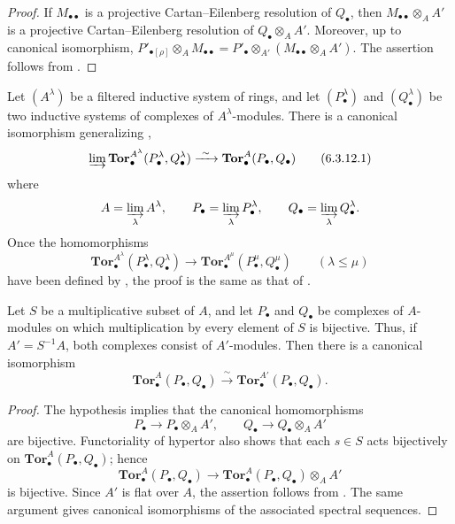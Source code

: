 \begin{proof}
If $M_{\bullet\bullet}$ is a projective Cartan--Eilenberg
resolution of $Q_\bullet$, then
$M_{\bullet\bullet}\otimes_AA'$ is a projective
Cartan--Eilenberg resolution of $Q_\bullet\otimes_AA'$.  Moreover,
up to canonical isomorphism, $P'_{\bullet[\rho]}\otimes_A M_{\bullet\bullet}
=P'_\bullet\otimes_{A'}(M_{\bullet\bullet}\otimes_A A')$.
The assertion follows from .
\end{proof}

\begin{remark}[6.3.12]
\label{III.6.3.12}
Let $(A^\lambda)$ be a filtered inductive system of rings, and let
$(P_\bullet^\lambda)$ and $(Q_\bullet^\lambda)$ be two inductive
systems of complexes of $A^\lambda$-modules.  There is a canonical
isomorphism generalizing ,
\[
  \varinjlim
  \mathbf{Tor}_\bullet^{A^\lambda}
  (P_\bullet^\lambda,Q_\bullet^\lambda)
  \xrightarrow{\ \sim\ }
  \mathbf{Tor}_\bullet^A(P_\bullet,Q_\bullet)
  \tag{6.3.12.1}\label{III.6.3.12.1}
\]
where
\[
  A=\varinjlim_\lambda A^\lambda,
  \qquad
  P_\bullet=\varinjlim_\lambda P_\bullet^\lambda,
  \qquad
  Q_\bullet=\varinjlim_\lambda Q_\bullet^\lambda.
\]
Once the homomorphisms
\[
  \mathbf{Tor}_\bullet^{A^\lambda}
  (P_\bullet^\lambda,Q_\bullet^\lambda)
  \longrightarrow
  \mathbf{Tor}_\bullet^{A^\mu}
  (P_\bullet^\mu,Q_\bullet^\mu)
  \qquad(\lambda\leq\mu)
\]
have been defined by , the proof is the same as
that of .
\end{remark}

\begin{proposition}[6.3.13]
\label{III.6.3.13}
Let $S$ be a multiplicative subset of $A$, and let $P_\bullet$ and
$Q_\bullet$ be complexes of $A$-modules on which multiplication by
every element of $S$ is bijective.  Thus, if $A'=S^{-1}A$, both
complexes consist of $A'$-modules.  Then there is a canonical
isomorphism
\[
  \mathbf{Tor}_\bullet^A(P_\bullet,Q_\bullet)
  \xrightarrow{\ \sim\ }
  \mathbf{Tor}_\bullet^{A'}(P_\bullet,Q_\bullet).
\]
\end{proposition}

\begin{proof}
The hypothesis implies that the canonical homomorphisms
\[
  P_\bullet\longrightarrow P_\bullet\otimes_AA',
  \qquad
  Q_\bullet\longrightarrow Q_\bullet\otimes_AA'
\]
are bijective.  Functoriality of hypertor also shows that each
$s\in S$ acts bijectively on
$\mathbf{Tor}_\bullet^A(P_\bullet,Q_\bullet)$; hence
\[
  \mathbf{Tor}_\bullet^A(P_\bullet,Q_\bullet)
  \longrightarrow
  \mathbf{Tor}_\bullet^A(P_\bullet,Q_\bullet)\otimes_AA'
\]
is bijective.  Since $A'$ is flat over $A$, the assertion follows
from .  The same argument gives canonical
isomorphisms of the associated spectral sequences.
\end{proof}


